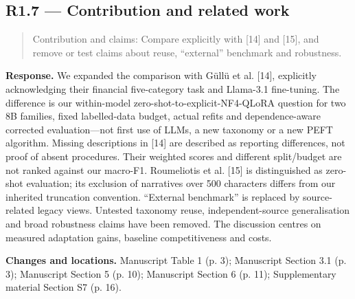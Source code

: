 \documentclass[11pt,a4paper]{article}
\begin{document}
\subsection*{R1.7 — Contribution and related work}
\begin{quote}\small Contribution and claims: Compare explicitly with [14] and [15], and remove or test claims about reuse, “external” benchmark and robustness.\end{quote}
\textbf{Response.} We expanded the comparison with Güllü et al. [14], explicitly acknowledging their financial five-category task and Llama-3.1 fine-tuning. The difference is our within-model zero-shot-to-explicit-NF4-QLoRA question for two 8B families, fixed labelled-data budget, actual refits and dependence-aware corrected evaluation—not first use of LLMs, a new taxonomy or a new PEFT algorithm. Missing descriptions in [14] are described as reporting differences, not proof of absent procedures. Their weighted scores and different split/budget are not ranked against our macro-F1. Roumeliotis et al. [15] is distinguished as zero-shot evaluation; its exclusion of narratives over 500 characters differs from our inherited truncation convention. “External benchmark” is replaced by source-related legacy views. Untested taxonomy reuse, independent-source generalisation and broad robustness claims have been removed. The discussion centres on measured adaptation gains, baseline competitiveness and costs.

\textbf{Changes and locations.} Manuscript Table 1 (p. 3); Manuscript Section 3.1 (p. 3); Manuscript Section 5 (p. 10); Manuscript Section 6 (p. 11); Supplementary material Section S7 (p. 16).
\end{document}
